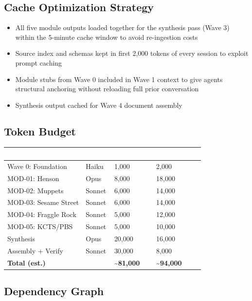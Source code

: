 \documentclass[11pt,letterpaper]{article}
\newcommand{\tableheader}[1]{\textbf{\sffamily\textcolor{white}{#1}}}
\begin{document}
\subsection{Cache Optimization Strategy}

\begin{itemize}[leftmargin=*]
  \item All five module outputs loaded together for the synthesis pass (Wave 3) within the 5-minute cache window to avoid re-ingestion costs
  \item Source index and schemas kept in first 2,000 tokens of every session to exploit prompt caching
  \item Module stubs from Wave 0 included in Wave 1 context to give agents structural anchoring without reloading full prior conversation
  \item Synthesis output cached for Wave 4 document assembly
\end{itemize}

\subsection{Token Budget}

\begin{center}
\begin{tabularx}{\textwidth}{L{4cm}C{2.5cm}C{2.5cm}C{2.5cm}}
\toprule
{}
\tableheader{Component} & \tableheader{Model} & \tableheader{Est. Input} & \tableheader{Est. Output} \\
\midrule
Wave 0: Foundation & Haiku & 1,000 & 2,000 \\
MOD-01: Henson & Opus & 8,000 & 18,000 \\
MOD-02: Muppets & Sonnet & 6,000 & 14,000 \\
MOD-03: Sesame Street & Sonnet & 6,000 & 14,000 \\
MOD-04: Fraggle Rock & Sonnet & 5,000 & 12,000 \\
MOD-05: KCTS/PBS & Sonnet & 5,000 & 10,000 \\
Synthesis & Opus & 20,000 & 16,000 \\
Assembly + Verify & Sonnet & 30,000 & 8,000 \\
\midrule
\textbf{Total (est.)} & & \textbf{\~{}81,000} & \textbf{\~{}94,000} \\
\bottomrule
\end{tabularx}
\end{center}

\subsection{Dependency Graph}
\end{document}
